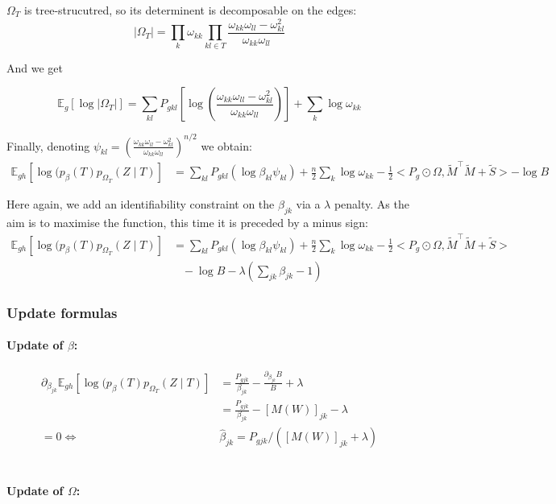 \documentclass[11pt,a4paper]{article}
\newcommand{\Esp}{\mathds{E}}
\begin{document}
$\Omega_T$ is tree-strucutred, so its determinent is decomposable on the edges:
$$|\Omega_{T}| = \prod_{k} \omega_{kk} \prod_{kl \in T} \frac{\omega_{kk}\omega_{ll}-\omega_{kl}^2}{\omega_{kk}\omega_{ll}}$$

And we get

$$\Esp_g[\log |\Omega_{T}|]= \sum _{kl} P_{gkl} \left[ \log\left(\frac{\omega_{kk}\omega_{ll}-\omega_{kl}^2}{\omega_{kk}\omega_{ll}}\right)\right] + \sum_k \log \omega_{kk}$$

Finally, denoting $\psi_{kl} = \left(\frac{\omega_{kk}\omega_{ll}-\omega_{kl}^2}{\omega_{kk}\omega_{ll}}\right)^{n/2}$ we obtain:
\begin{align*}
\Esp_{gh} [\log (p_\beta(T)p_{\Omega_T}(Z\mid T) ] &=\sum_{kl} P_{gkl} \left(\log  \beta_{kl}\psi_{kl}\right) + \frac{n}{2}\sum_k \log \omega_{kk} - \frac{1}{2}<P_g \odot \Omega, \widetilde{M}^\intercal \widetilde{M} + \widetilde{S}>- \log B
\end{align*}

Here again, we add an identifiability constraint on the $\beta_{jk}$ via a $\lambda$ penalty. As the aim is to maximise the function, this time it is preceded by a minus sign:
\begin{align*}
\Esp_{gh} [\log (p_\beta(T)p_{\Omega_T}(Z\mid T) ] &=\sum_{kl} P_{gkl} \left(\log  \beta_{kl}\psi_{kl}\right) + \frac{n}{2}\sum_k \log \omega_{kk} - \frac{1}{2}<P_g \odot \Omega, \widetilde{M}^\intercal \widetilde{M} + \widetilde{S}>\\
& \;\;\;- \log B - \lambda(\sum_{jk} \beta_{jk} - 1 )
\end{align*}
\subsubsection{Update formulas}
\paragraph{Update of $\beta$:}
\begin{align*}
\partial_{\beta_{jk}} \Esp_{gh} [\log (p_\beta(T)p_{\Omega_T}(Z\mid T) ] &= \frac{P_{gjk}}{\beta_{jk}} - \frac{\partial_{\beta_{jk}} B }{B} + \lambda\\
&=\frac{P_{gjk}}{\beta_{jk}}  - [M(W)]_{jk} - \lambda\\
=0 \iff & \boxed{\widehat{\beta}_{jk} = P_{gjk} / ([M(W)]_{jk} + \lambda)}
\end{align*}\\


\paragraph{Update of $\Omega$:}
\end{document}
